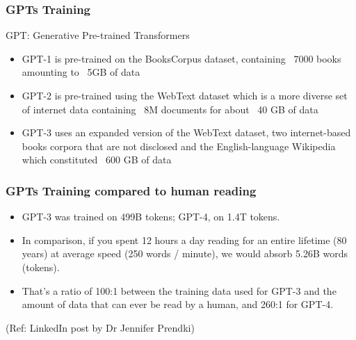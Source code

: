 
\begin{frame}[fragile]\frametitle{GPTs Training}

GPT: Generative Pre-trained Transformers

\begin{itemize}
\item GPT-1 is pre-trained on the BooksCorpus dataset, containing ~7000 books amounting to ~5GB of data
\item GPT-2 is pre-trained using the WebText dataset which is a more diverse set of internet data containing ~8M documents for about ~40 GB of data
\item GPT-3 uses an expanded version of the WebText dataset, two internet-based books corpora that are not disclosed and the English-language Wikipedia which constituted ~600 GB of data
\end{itemize}	 

\end{frame}

\begin{frame}[fragile]\frametitle{GPTs Training compared to human reading}

\begin{itemize}
\item GPT-3 was trained on 499B tokens; GPT-4, on 1.4T tokens.
\item In comparison, if you spent 12 hours a day reading for an entire lifetime (80 years) at average speed (250 words / minute), we would absorb 5.26B words (tokens).
\item That's a ratio of 100:1 between the training data used for GPT-3 and the amount of data that can ever be read by a human, and 260:1 for GPT-4.
\end{itemize}	 

\tiny{(Ref: LinkedIn post by Dr Jennifer Prendki)}

\end{frame}

